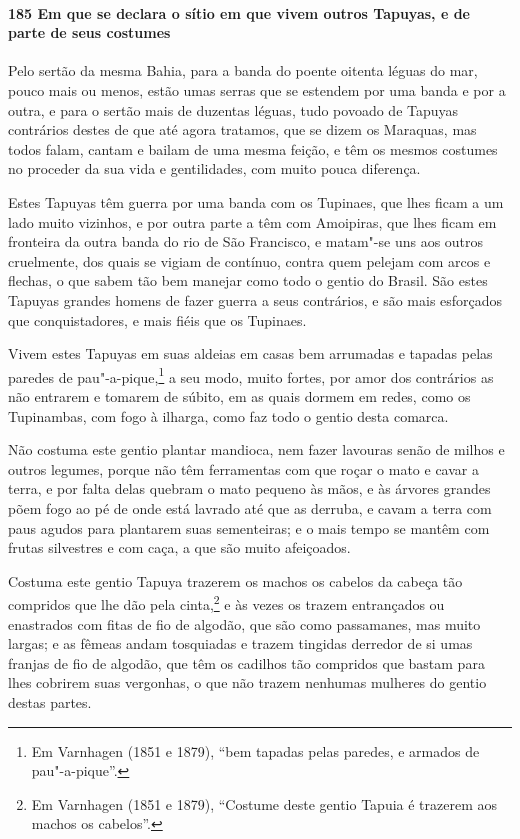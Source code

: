 \begin{linenumbers}
\paragraph{185 Em que se declara o sítio em que vivem outros Tapuyas, e de parte de seus
costumes}\quad
Pelo sertão da mesma Bahia, para a banda do poente oitenta léguas do mar, pouco mais ou
menos, estão umas serras que se estendem por uma banda e por a outra, e para o sertão mais
de duzentas léguas, tudo povoado de Tapuyas contrários destes de que até agora tratamos,
que se dizem os Maraquas, mas todos falam, cantam e bailam de uma mesma feição, e têm os
mesmos costumes no proceder da sua vida e gentilidades, com muito pouca diferença.

Estes Tapuyas têm guerra por uma banda com os Tupinaes, que lhes ficam a um lado muito
vizinhos, e por outra parte a têm com Amoipiras, que lhes ficam em fronteira da outra
banda do rio de São Francisco, e matam"-se uns aos outros cruelmente, dos quais se vigiam
de contínuo, contra quem pelejam com arcos e flechas, o que sabem tão bem manejar como
todo o gentio do Brasil. São estes Tapuyas grandes homens de fazer guerra a seus
contrários, e são mais esforçados que conquistadores, e mais fiéis que os Tupinaes.

Vivem estes Tapuyas em suas aldeias em casas bem arrumadas e tapadas pelas paredes de
pau"-a-pique,\footnote{ Em Varnhagen (1851 e 1879), ``bem tapadas pelas paredes, e armados
de pau"-a-pique''.} a seu modo, muito fortes, por amor dos contrários as não entrarem e
tomarem de súbito, em as quais dormem em redes, como os Tupinambas, com fogo à ilharga,
como faz todo o gentio desta comarca.

Não costuma este gentio plantar mandioca, nem fazer lavouras senão de milhos e outros
legumes, porque não têm ferramentas com que roçar o mato e cavar a terra, e por falta
delas quebram o mato pequeno às mãos, e às árvores grandes põem fogo ao pé de onde está
lavrado até que as derruba, e cavam a terra com paus agudos para plantarem suas
sementeiras; e o mais tempo se mantêm com frutas silvestres e com caça, a que são muito
afeiçoados.

Costuma este gentio Tapuya trazerem os machos os cabelos da cabeça tão compridos que lhe
dão pela cinta,\footnote{ Em Varnhagen (1851 e 1879), ``Costume deste gentio Tapuia é
trazerem aos machos os cabelos''.} e às vezes os trazem entrançados ou enastrados com
fitas de fio de algodão, que são como passamanes, mas muito largas; e as fêmeas andam
tosquiadas e trazem tingidas derredor de si umas franjas de fio de algodão, que têm os
cadilhos tão compridos que bastam para lhes cobrirem suas vergonhas, o que não trazem
nenhumas mulheres do gentio destas partes.


\end{linenumbers}
